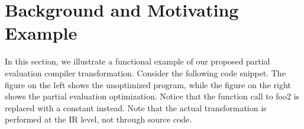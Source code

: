 \section{Background and Motivating Example}

In this section, we illustrate a functional example of our proposed partial evaluation compiler transformation.
Consider the following code snippet.
The figure on the left shows the unoptimized program, while the figure on the right shows the partial evaluation optimization.
Notice that the function call to foo2 is replaced with a constant instead.
Note that the actual transformation is performed at the IR level, not through source code.
